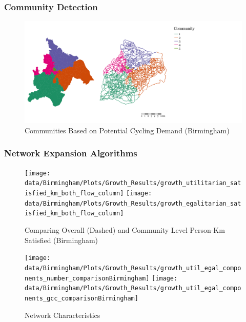 \documentclass[
]{article}
\begin{document}
\clearpage

\subsubsection{Community Detection}

\begin{figure}

{\centering \includegraphics[width=0.9\linewidth]{data/Birmingham/Plots/communities_alternative_Birmingham} 

}

\caption{Communities Based on Potential Cycling Demand (Birmingham)}\label{fig:communitiesBirmingham}
\end{figure}

\subsubsection{Network Expansion Algorithms}

\begin{figure}[H]

{\centering \texttt{[image: data/Birmingham/Plots/Growth\_Results/growth\_utilitarian\_satisfied\_km\_both\_flow\_column]} \texttt{[image: data/Birmingham/Plots/Growth\_Results/growth\_egalitarian\_satisfied\_km\_both\_flow\_column]} 

}

\caption{Comparing Overall (Dashed) and Community Level Person-Km Satisfied (Birmingham)}\label{fig:growthtotalBirmingham}
\end{figure}

\begin{figure}[H]

{\centering \texttt{[image: data/Birmingham/Plots/Growth\_Results/growth\_util\_egal\_components\_number\_comparisonBirmingham]} \texttt{[image: data/Birmingham/Plots/Growth\_Results/growth\_util\_egal\_components\_gcc\_comparisonBirmingham]} 

}

\caption{Network Characteristics}\label{fig:componentsandGCCBirmingham}
\end{figure}
\end{document}
